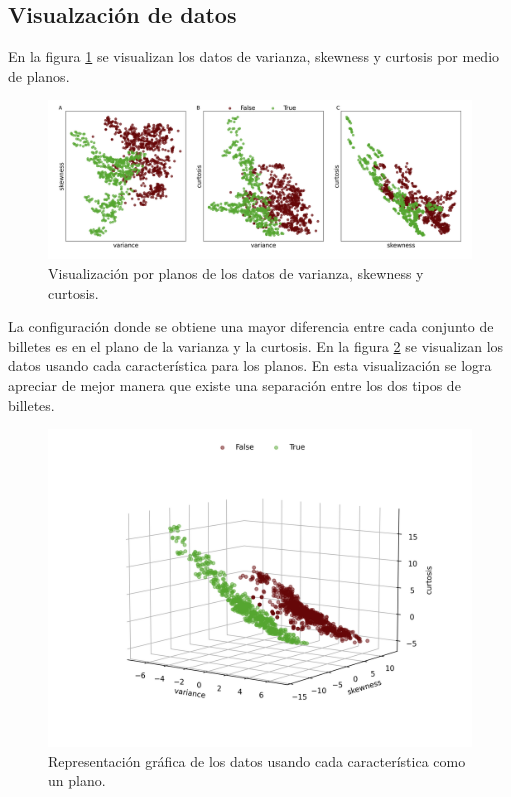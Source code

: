 \subsection*{Visualzación de datos}

En la figura \ref{fig:data_2d} se visualizan los datos de varianza, skewness y curtosis por medio de planos.

\begin{figure}[H]
    \centering
    \includegraphics[width=16cm]{Graphics/Problema_04/plot_2D.png}
    \caption{Visualización por planos de los datos de varianza, skewness y curtosis.}
    \label{fig:data_2d}
\end{figure}

La configuración donde se obtiene una mayor diferencia entre cada conjunto de billetes es en el plano de la varianza y la curtosis. En la figura \ref{fig:data_3d} se visualizan los datos usando cada característica para los planos. En esta visualización se logra apreciar de mejor manera que existe una separación entre los dos tipos de billetes.

\begin{figure}[H]
    \centering
    \includegraphics[width=16cm]{Graphics/Problema_04/plot_3D.png}
    \caption{Representación gráfica de los datos usando cada característica como un plano.}
    \label{fig:data_3d}
\end{figure}

